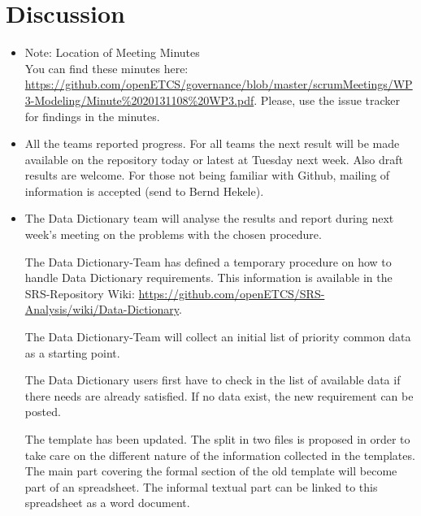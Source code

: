 \documentclass[a4paper, 11pt]{article}
\begin{document}
\section{Discussion}
\begin{itemize}
\item Note: Location of Meeting Minutes\\
You can find these minutes here: \url{https://github.com/openETCS/governance/blob/master/scrumMeetings/WP3-Modeling/Minute%2020131108%20WP3.pdf}. Please, use the issue tracker for findings in the minutes.
 
\item All the teams reported progress. For all teams the next result will be made available on the repository today or latest at Tuesday next week. Also draft results are welcome. For those not being familiar with Github, mailing of information is accepted (send to Bernd Hekele).

\item The Data Dictionary team will analyse the results and report during next week's meeting  on the problems with the chosen procedure.

The Data Dictionary-Team has defined a temporary procedure on how to handle Data Dictionary requirements. This information is available in the SRS-Repository Wiki: \url{https://github.com/openETCS/SRS-Analysis/wiki/Data-Dictionary}.

The Data Dictionary-Team will collect an initial list of priority common data as a starting point.

The Data Dictionary users first have to check in the list of available data if there needs are already satisfied. If no data exist, the new requirement can be posted.

The template has been updated. The split in two files is proposed in order to take care on the different nature of the information collected in the templates. The main part covering the formal section of the old template will become part of an spreadsheet. The informal textual part can be linked to this spreadsheet as a word document.
\end{itemize}
\end{document}
